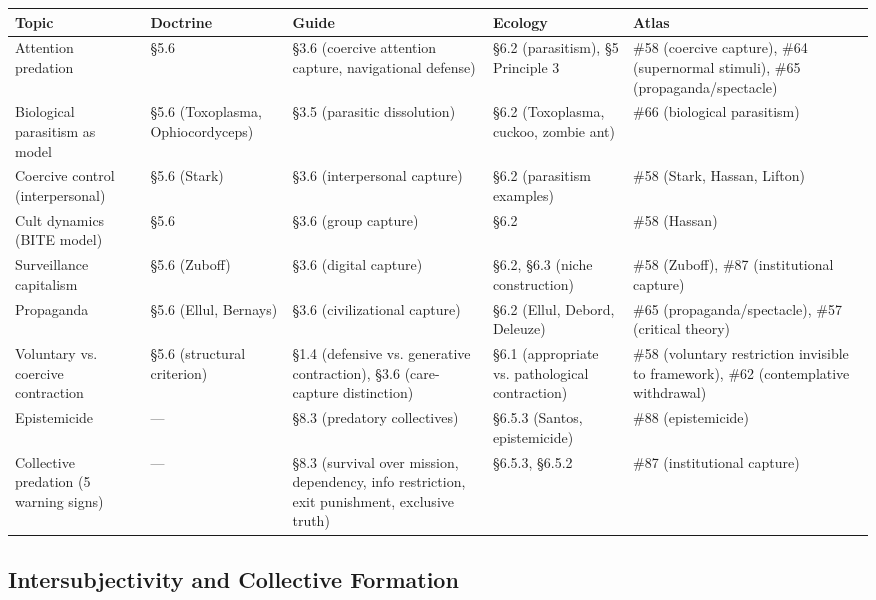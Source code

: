 \begin{longtable}{p{} p{} p{} p{} p{}}
\toprule
\textbf{Topic} & \textbf{Doctrine} & \textbf{Guide} & \textbf{Ecology} & \textbf{Atlas} \\
\midrule
\endhead
Attention predation & §5.6 & §3.6 (coercive attention capture, navigational defense) & §6.2 (parasitism), §5 Principle 3 & \#58 (coercive capture), \#64 (supernormal stimuli), \#65 (propaganda/spectacle) \\
Biological parasitism as model & §5.6 (Toxoplasma, Ophiocordyceps) & §3.5 (parasitic dissolution) & §6.2 (Toxoplasma, cuckoo, zombie ant) & \#66 (biological parasitism) \\
Coercive control (interpersonal) & §5.6 (Stark) & §3.6 (interpersonal capture) & §6.2 (parasitism examples) & \#58 (Stark, Hassan, Lifton) \\
Cult dynamics (BITE model) & §5.6 & §3.6 (group capture) & §6.2 & \#58 (Hassan) \\
Surveillance capitalism & §5.6 (Zuboff) & §3.6 (digital capture) & §6.2, §6.3 (niche construction) & \#58 (Zuboff), \#87 (institutional capture) \\
Propaganda & §5.6 (Ellul, Bernays) & §3.6 (civilizational capture) & §6.2 (Ellul, Debord, Deleuze) & \#65 (propaganda/spectacle), \#57 (critical theory) \\
Voluntary vs. coercive contraction & §5.6 (structural criterion) & §1.4 (defensive vs. generative contraction), §3.6 (care-capture distinction) & §6.1 (appropriate vs. pathological contraction) & \#58 (voluntary restriction invisible to framework), \#62 (contemplative withdrawal) \\
Epistemicide & — & §8.3 (predatory collectives) & §6.5.3 (Santos, epistemicide) & \#88 (epistemicide) \\
Collective predation (5 warning signs) & — & §8.3 (survival over mission, dependency, info restriction, exit punishment, exclusive truth) & §6.5.3, §6.5.2 & \#87 (institutional capture) \\
\bottomrule
\end{longtable}



\subsection*{Intersubjectivity and Collective Formation}



